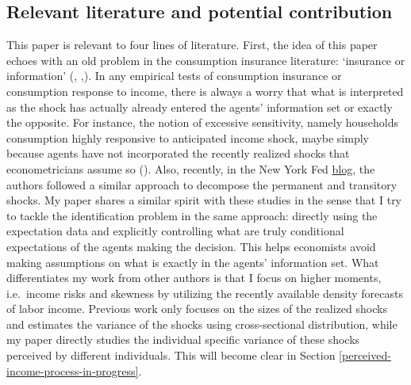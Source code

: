 \documentclass[12pt,notitlepage,onecolumn,aps,pra]{article}
\begin{document}
\hypertarget{relevant-literature-and-potential-contribution}{%
\subsection{Relevant literature and potential
contribution}\label{relevant-literature-and-potential-contribution}}

This paper is relevant to four lines of literature. First, the idea of
this paper echoes with an old problem in the consumption insurance
literature: `insurance or information' (\cite{pistaferri_superior_2001},
\cite{kaufmann_disentangling_2009},\cite{meghir2011earnings}). In any
empirical tests of consumption insurance or consumption response to
income, there is always a worry that what is interpreted as the shock
has actually already entered the agents' information set or exactly the
opposite. For instance, the notion of excessive sensitivity, namely
households consumption highly responsive to anticipated income shock,
maybe simply because agents have not incorporated the recently realized
shocks that econometricians assume so (\cite{flavin_excess_1988}). Also,
recently, in the New York Fed
\href{https://libertystreeteconomics.newyorkfed.org/2017/11/understanding-permanent-and-temporary-income-shocks.html}{blog},
the authors followed a similar approach to decompose the permanent and
transitory shocks. My paper shares a similar spirit with these studies
in the sense that I try to tackle the identification problem in the same
approach: directly using the expectation data and explicitly controlling
what are truly conditional expectations of the agents making the
decision. This helps economists avoid making assumptions on what is
exactly in the agents' information set. What differentiates my work from
other authors is that I focus on higher moments, i.e.~income risks and
skewness by utilizing the recently available density forecasts of labor
income. Previous work only focuses on the sizes of the realized shocks
and estimates the variance of the shocks using cross-sectional
distribution, while my paper directly studies the individual specific
variance of these shocks perceived by different individuals. This will
become clear in Section \ref{perceived-income-process-in-progress}.
\end{document}
